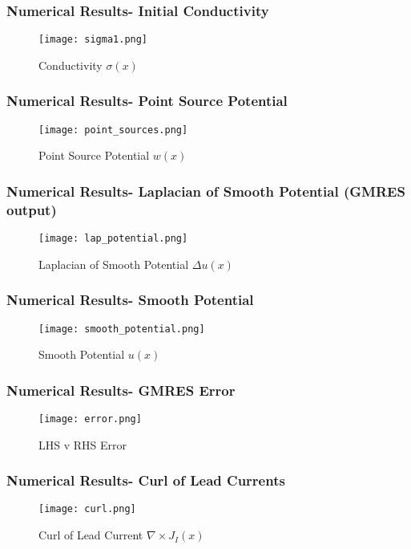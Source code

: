 \documentclass[]{beamer}
\begin{document}
\begin{frame}
    \frametitle{Numerical Results- Initial Conductivity}
            \centering
            \begin{figure}
            \texttt{[image: sigma1.png]}
            \caption{Conductivity $\sigma(x)$}
            \end{figure}
\end{frame}

\begin{frame}
    \frametitle{Numerical Results- Point Source Potential}
            \centering
            \begin{figure}
            \texttt{[image: point\_sources.png]}
            \caption{Point Source Potential $w(x)$}
            \end{figure}
  \end{frame}

  \begin{frame}
      \frametitle{Numerical Results- Laplacian of Smooth Potential (GMRES output)}
            \centering
            \begin{figure}
            \texttt{[image: lap\_potential.png]}
            \caption{Laplacian of Smooth Potential $\Delta u(x)$}
            \end{figure}
  \end{frame}

    \begin{frame}
      \frametitle{Numerical Results- Smooth Potential}
            \centering
            \begin{figure}
            \texttt{[image: smooth\_potential.png]}
            \caption{Smooth Potential $u(x)$}
            \end{figure}
  \end{frame}

   \begin{frame}
      \frametitle{Numerical Results- GMRES Error}
            \centering
            \begin{figure}
            \texttt{[image: error.png]}
            \caption{LHS v RHS Error}
            \end{figure}
  \end{frame}

   \begin{frame}
      \frametitle{Numerical Results- Curl of Lead Currents}
            \centering
            \begin{figure}
            \texttt{[image: curl.png]}
            \caption{Curl of Lead Current $\nabla \times J_{I}(x)$}
            \end{figure}
  \end{frame}
\end{document}
